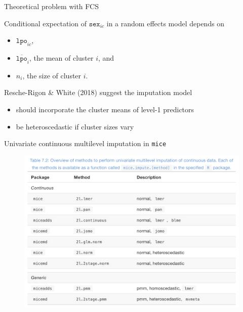\documentclass[ignorenonframetext,aspectratio=43]{beamer}
\providecommand{\tightlist}{%
  \setlength{\itemsep}{0pt}\setlength{\parskip}{0pt}}
\begin{document}
\begin{frame}{Theoretical problem with FCS}

Conditional expectation of \(\texttt{sex}_{ic}\) in a random effects
model depends on

\begin{itemize}
\tightlist
\item
  \(\texttt{lpo}_{ic}\),
\item
  \(\overline{\texttt{lpo}}_{i}\), the mean of cluster \(i\), and
\item
  \(n_i\), the size of cluster \(i\).
\end{itemize}

Resche-Rigon \& White (2018) suggest the imputation model

\begin{itemize}
\tightlist
\item
  should incorporate the cluster means of level-1 predictors
\item
  be heteroscedastic if cluster sizes vary
\end{itemize}

\end{frame}

\begin{frame}{Univariate continuous multilevel imputation in
\texttt{mice}}

\begin{figure}
\centering
\includegraphics{figures/fig1.png}
\caption{}
\end{figure}

\end{frame}
\end{document}
